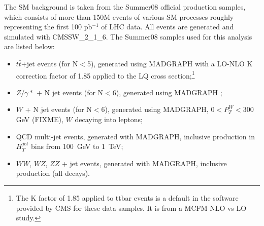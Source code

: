 The SM background is taken from the Summer08 official production samples,
which consists of more than 150M events of various SM processes roughly representing the first 100 pb$^{-1}$ of LHC data.
All events are generated and simulated with CMSSW\_2\_1\_6. 
The Summer08 samples used for this analysis are listed below:
\begin{itemize}
%
\item $t\bar{t}$+jet events (for N$<$5), generated using MADGRAPH \cite{Mangano:2002ea} with a 
LO-NLO K correction factor of 1.85 applied 
to the LQ cross section;\footnote{The K factor of 1.85 applied to ttbar events is a default in the software provided by CMS for 
 these data samples.  It is from a MCFM NLO vs LO study.}
%
\item $Z/\gamma*$ + N jet events (for N$<$6), generated using MADGRAPH
;  
%
\item $W$ + N jet events (for N$<$6), generated using MADGRAPH, $ 0 < P_{T}^{W} < 300 $ GeV (FIXME), $W$ decaying into leptons;  
%
\item QCD multi-jet events, generated with MADGRAPH, inclusive production in $H_{T}^{jet}$ bins from 100~GeV to 1~TeV;  
%
%
\item $WW$, $WZ$, $ZZ$ + jet events, generated with MADGRAPH, inclusive production (all decays).
\end{itemize} 


%
